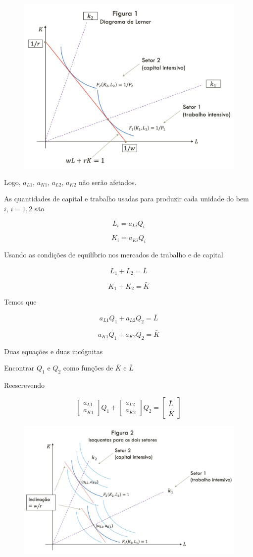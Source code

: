 \documentclass[a4paper,12pt]{article}[abntex2]
\begin{document}
\begin{figure}[H]
    \centering
    \includegraphics[width=0.7\linewidth]{Imagens/a11i1.png}
\end{figure}

Logo, $a_{L1}$, $a_{K1}$, $a_{L2}$, $a_{K2}$ não serão afetados.

As quantidades de capital e trabalho usadas para produzir cada unidade do bem $i$, $i = 1,2$ são

\[
L_i = a_{Li} Q_i
\]

\[
K_i = a_{Ki} Q_i
\]

Usando as condições de equilíbrio nos mercados de trabalho e de capital

\[
L_1 + L_2 = \bar{L}
\]

\[
K_1 + K_2 = \bar{K}
\]

Temos que

\[
a_{L1} Q_1 + a_{L2} Q_2 = \bar{L}
\]

\[
a_{K1} Q_1 + a_{K2} Q_2 = \bar{K}
\]

Duas equações e duas incógnitas

Encontrar $Q_1$ e $Q_2$ como funções de $\bar{K}$ e $\bar{L}$

Reescrevendo

\[
\begin{bmatrix} 
a_{L1} \\ 
a_{K1} 
\end{bmatrix} Q_1 + 
\begin{bmatrix} 
a_{L2} \\ 
a_{K2} 
\end{bmatrix} Q_2 = 
\begin{bmatrix} 
\bar{L} \\ 
\bar{K}
\end{bmatrix}
\]

\begin{figure}[H]
    \centering
    \includegraphics[width=0.7\linewidth]{Imagens/a11i2.png}
\end{figure}
\end{document}
